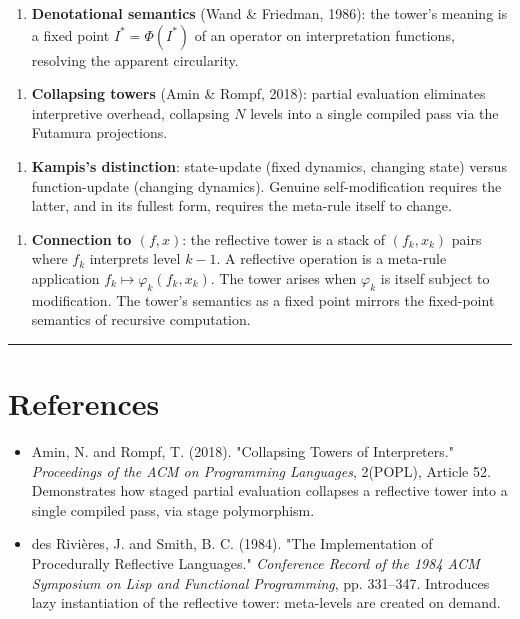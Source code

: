 \begin{enumerate}
  \item \textbf{Denotational semantics} (Wand & Friedman, 1986): the tower's meaning is a fixed point $I^* = \Phi(I^*)$ of an operator on interpretation functions, resolving the apparent circularity.
\end{enumerate}

\begin{enumerate}
  \item \textbf{Collapsing towers} (Amin & Rompf, 2018): partial evaluation eliminates interpretive overhead, collapsing $N$ levels into a single compiled pass via the Futamura projections.
\end{enumerate}

\begin{enumerate}
  \item \textbf{Kampis's distinction}: state-update (fixed dynamics, changing state) versus function-update (changing dynamics). Genuine self-modification requires the latter, and in its fullest form, requires the meta-rule itself to change.
\end{enumerate}

\begin{enumerate}
  \item \textbf{Connection to $(f, x)$}: the reflective tower is a stack of $(f_k, x_k)$ pairs where $f_k$ interprets level $k-1$. A reflective operation is a meta-rule application $f_k \mapsto \varphi_k(f_k, x_k)$. The tower arises when $\varphi_k$ is itself subject to modification. The tower's semantics as a fixed point mirrors the fixed-point semantics of recursive computation.
\end{enumerate}

\bigskip\hrule\bigskip

\section{References}

\begin{itemize}
  \item Amin, N. and Rompf, T. (2018). "Collapsing Towers of Interpreters." \textit{Proceedings of the ACM on Programming Languages}, 2(POPL), Article 52. Demonstrates how staged partial evaluation collapses a reflective tower into a single compiled pass, via stage polymorphism.
\end{itemize}

\begin{itemize}
  \item des Rivières, J. and Smith, B. C. (1984). "The Implementation of Procedurally Reflective Languages." \textit{Conference Record of the 1984 ACM Symposium on Lisp and Functional Programming}, pp. 331--347. Introduces lazy instantiation of the reflective tower: meta-levels are created on demand.
\end{itemize}

